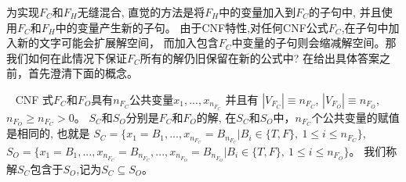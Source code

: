 为实现$F_C$和$F_H$无缝混合,
直觉的方法是将$F_H$中的变量加入到$F_C$的子句中,
并且使用$F_C$和$F_H$中的变量产生新的子句。
由于CNF特性,对任何CNF公式$F_C$,在子句中加入新的文字可能会扩展解空间，
而加入包含$F_C$中变量的子句则会缩减解空间。那我们如何在此情况下保证$F_C$所有的解仍旧保留在新的公式中?
在给出具体答案之前，首先澄清下面的概念。
%
%
%

\begin{definition}~
CNF 式$F_C$和$F_O$具有$n_{F_C}$公共变量$x_1,...,x_{n_{F_C}}$ 并且有
$|V_{F_C}|\equiv n_{F_C}$, $|V_{F_O}|\equiv n_{F_O}$, $ n_{F_O}\geqslant n_{F_C} > 0$。
$S_C$和$S_O$分别是$F_C$和$F_O$的解,
在$S_C$和$S_O$中，$n_{F_C}$个公共变量的赋值是相同的, 也就是
$S_C=\{x_1=B_1,...,x_{n_{F_C}}=B_{n_{F_C}} | B_i \in \{T,F\},~1\leqslant i\leqslant n_{F_C} \}$,
$S_O=\{x_1=B_1,...,x_{n_{F_C}}=B_{n_{F_C}},...,x_{n_{F_O}}=B_{n_{F_O}}|B_i\in \{T,F\},~ 1\leqslant i\leqslant n_{F_O} \}$。
我们称解$S_C$包含于$S_O$,记为$S_C\subseteq S_O$。
\end{definition}

